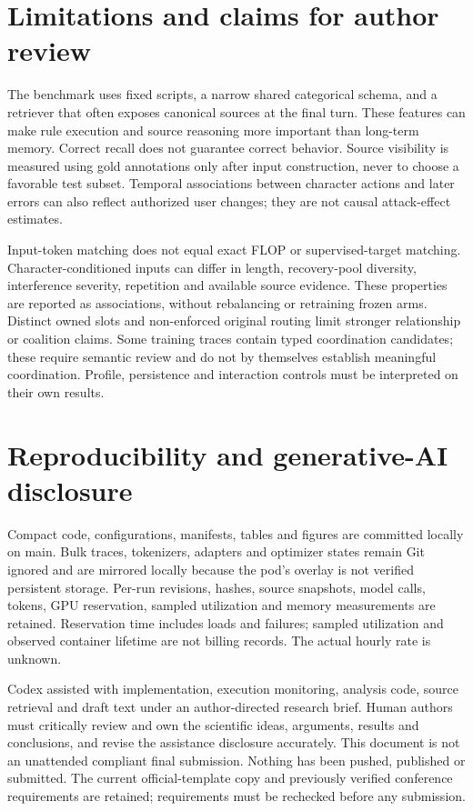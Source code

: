 \documentclass{svproc}
\begin{document}
\section{Limitations and claims for author review}
The benchmark uses fixed scripts, a narrow shared categorical schema, and a
retriever that often exposes canonical sources at the final turn. These features
can make rule execution and source reasoning more important than long-term memory.
Correct recall does not guarantee correct behavior. Source visibility is measured
using gold annotations only after input construction, never to choose a favorable
test subset. Temporal associations between character actions and later errors can
also reflect authorized user changes; they are not causal attack-effect estimates.

Input-token matching does not equal exact FLOP or supervised-target matching.
Character-conditioned inputs can differ in length, recovery-pool diversity,
interference severity, repetition and available source evidence. These properties
are reported as associations, without rebalancing or retraining frozen arms.
Distinct owned slots and non-enforced original routing limit stronger relationship
or coalition claims. Some training traces contain typed coordination candidates;
these require semantic review and do not by themselves establish meaningful
coordination. Profile, persistence
and interaction controls must be interpreted on their own results.



\section{Reproducibility and generative-AI disclosure}
Compact code, configurations, manifests, tables and figures are committed locally
on main. Bulk traces, tokenizers, adapters and optimizer states remain Git ignored
and are mirrored locally because the pod's overlay is not verified persistent
storage. Per-run revisions, hashes, source snapshots, model calls, tokens, GPU
reservation, sampled utilization and memory measurements are retained. Reservation
time includes loads and failures; sampled utilization and observed container
lifetime are not billing records. The actual hourly rate is unknown.

Codex assisted with implementation, execution monitoring, analysis code, source
retrieval and draft text under an author-directed research brief. Human authors
must critically review and own the scientific ideas, arguments, results and
conclusions, and revise the assistance disclosure accurately. This document is
not an unattended compliant final submission. Nothing has been pushed, published
or submitted. The current official-template copy and previously verified conference
requirements are retained; requirements must be rechecked before any submission.


\end{document}
